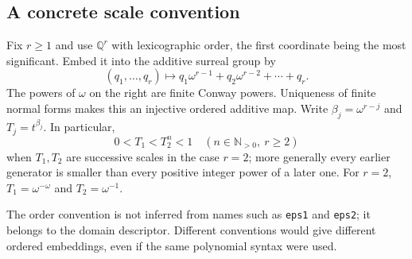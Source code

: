 \documentclass[11pt,letterpaper]{article}
\numberwithin{equation}{section}
\theoremstyle{definition}
\theoremstyle{remark}\newtheorem{remark}[theorem]{Remark}
\newcommand{\Q}{\mathbb Q}
\newcommand{\N}{\mathbb N}
\begin{document}
\subsection{A concrete scale convention}
Fix $r\ge1$ and use $\Q^r$ with lexicographic order, the first coordinate being
the most significant. Embed it into the additive surreal group by
\begin{equation}\label{eq:embedding}
 (q_1,\ldots,q_r)\longmapsto
 q_1\omega^{r-1}+q_2\omega^{r-2}+\cdots+q_r.
\end{equation}
The powers of $\omega$ on the right are finite Conway powers. Uniqueness of
finite normal forms makes this an injective ordered additive map. Write
$\beta_j=\omega^{r-j}$ and $T_j=t^{\beta_j}$. In particular,
\[
 0<T_1<T_2^n<1\quad(n\in\N_{>0},\ r\ge2)
\]
when $T_1,T_2$ are successive scales in the case $r=2$; more generally every
earlier generator is smaller than every positive integer power of a later
one. For $r=2$, $T_1=\omega^{-\omega}$ and $T_2=\omega^{-1}$.

The order convention is not inferred from names such as \texttt{eps1} and
\texttt{eps2}; it belongs to the domain descriptor. Different conventions
would give different ordered embeddings, even if the same polynomial syntax
were used.
\end{document}
